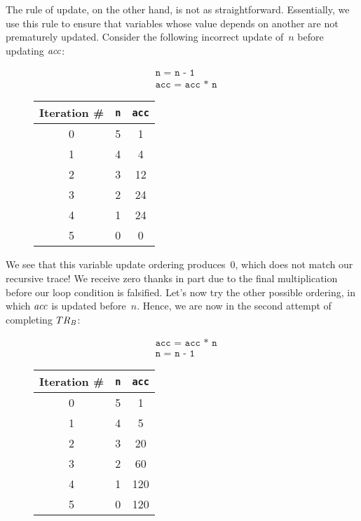 The rule of update, on the other hand, is not as straightforward. 
Essentially, we use this rule to ensure that variables whose value depends on another are not prematurely updated. 
Consider the following incorrect update of~$n$ before updating $\emph{acc}$:
\begin{figure}[H]
\centering
\begin{minipage}{.4\textwidth}
  \begin{align*}
  &\texttt{n = n - 1}\\
  &\texttt{acc = acc * n}
  \end{align*}
\end{minipage}%
\begin{minipage}{.4\textwidth}
\begin{tabular}{c|c|c}
Iteration \# & \texttt{n} & \texttt{acc}\\
\hline
\hline
0 & 5 & 1\\
\hline
1 & 4 & 4\\
\hline
2 & 3 & 12\\
\hline
3 & 2 & 24\\
\hline
4 & 1 & 24\\
\hline
5 & 0 & 0\\
\end{tabular}
\end{minipage}
\end{figure}

We see that this variable update ordering produces~$0$, which does not match our recursive trace! 
We receive zero thanks in part due to the final multiplication before our loop condition is falsified. 
Let's now try the other possible ordering, in which $\emph{acc}$ is updated before~$n$. 
Hence, we are now in the second attempt of completing $TR_\emph{B}$:

\begin{figure}[H]
\centering
\begin{minipage}{.4\textwidth}
  \begin{align*}
  &\texttt{acc = acc * n}\\
  &\texttt{n = n - 1}
  \end{align*}
\end{minipage}%
\begin{minipage}{.4\textwidth}
\begin{tabular}{c|c|c}
Iteration \# & \texttt{n} & \texttt{acc}\\
\hline
\hline
0 & 5 & 1\\
\hline
1 & 4 & 5\\
\hline
2 & 3 & 20\\
\hline
3 & 2 & 60\\
\hline
4 & 1 & 120\\
\hline
5 & 0 & 120\\
\end{tabular}
\end{minipage}
\end{figure}

